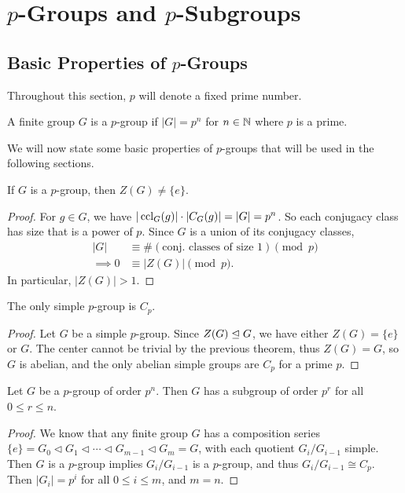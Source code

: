 \documentclass[a4paper]{scrartcl}
\begin{document}
\section{$p$-Groups and $p$-Subgroups}

\subsection{Basic Properties of $p$-Groups}

Throughout this section, $p$ will denote a fixed prime number.

\begin{definition}[$p$-group]
	A finite group $G$ is a $p$-group if $|G| = p^n$ for $n \in \mathbb{N}$ where $p$ is a prime.
\end{definition}


We will now state some basic properties of $p$-groups that will be used in the following sections.

\begin{theorem}
	If $G$ is a $p$-group, then $Z(G) \neq \{e\}$.
\end{theorem}
\begin{proof}
	For $g \in G$, we have $|\operatorname{ccl}_G(g)| \cdot |C_G(g)| = |G| = p^n$. So each conjugacy class has size that is a power of $p$. 
	Since $G$ is a union of its conjugacy classes, 
	\begin{align*}
		|G| &\equiv \#(\text{conj. classes of size 1}) \pmod{p}  \\
\implies 0 &\equiv |Z(G)| \pmod{p}.
	\end{align*}
	In particular, $|Z(G)| > 1$.
\end{proof}

\begin{corollary}
	The only simple $p$-group is $C_p$.
\end{corollary}
\begin{proof}
	Let $G$ be a simple $p$-group. Since $Z(G) \trianglelefteq G$, we have either $Z(G) = \{e\}$ or $G$. The center cannot be trivial by the previous theorem, thus $Z(G) = G$, so $G$ is abelian, and the only abelian simple groups are $C_p$ for a prime $p$.
\end{proof}

\begin{corollary}
	Let $G$ be a $p$-group of order $p^n$. Then $G$ has a subgroup of order $p^r$ for all $0 \leq r \leq n$.
\end{corollary}
\begin{proof}
	We know that any finite group $G$ has a composition series $\{e\} = G_0 \triangleleft G_1 \triangleleft \cdots \triangleleft G_{m - 1} \triangleleft G_m = G$, with each quotient $G_i / G_{i - 1}$ simple. Then $G$ is a $p$-group implies $G_i/G_{i - 1}$ is a $p$-group, and thus $G_i/G_{i - 1} \cong C_p$. Then $|G_i| = p^i$ for all $0 \leq i \leq m$, and $m = n$.
\end{proof}
\end{document}
